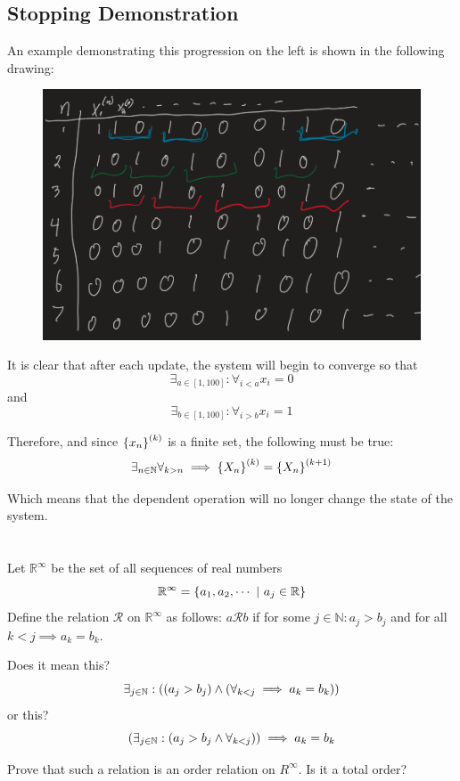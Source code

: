 \documentclass[]{article}
\newcommand{\Rel}{\mathcal{R}}
\newcommand{\R}{\mathbb{R}}
\newcommand{\N}{\mathbb{N}}
\begin{document}
\newpage
\subsection*{Stopping Demonstration}
An example demonstrating this progression on the left is shown in the following drawing: 
\begin{figure}[h]
    \centering
    \includegraphics[width = 0.7 \textwidth]{MidExam1_pblm1_b.png}
\end{figure}

It is clear that after each update, the system will begin to converge so that 
$$\exists_{a \in [1,100]} : \forall_{i < a} x_i = 0$$ and 
$$\exists_{b \in [1,100]} : \forall_{i > b} x_i = 1$$

Therefore, and since $\qty{x_n}^{(k)}$ is a finite set, the following must be true:
$$\exists_{n \in \N} \forall_{k > n} \implies \qty{X_n}^{(k)} = \qty{X_n}^{(k+1)}$$

Which means that the dependent operation will no longer change the state of the system.

\newpage
\section{}
Let $\R^\infty$ be the set of all sequences of real numbers
$$\R^\infty = \qty{a_1,a_2,\cdots \ | \ a_j \in \R}$$
Define the relation $\Rel$ on $\R^\infty$ as follows:
$a\Rel b$ if for some $j \in \N : a_j > b_j$ and for all $k < j \implies a_k = b_k$.


Does it mean this?
$$\exists_{j \in \N} : \qty((a_j > b_j) \land (\forall_{k<j} \implies a_k = b_k))$$
or this?
$$\qty(\exists_{j \in \N} : (a_j > b_j \land \forall_{k<j})) \implies a_k = b_k$$

Prove that such a relation is an order relation on $R^\infty$. Is it a total order?
\end{document}
